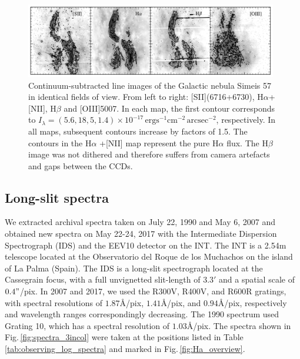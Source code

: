 \documentclass{aa}
\begin{document}
\begin{figure}
\includegraphics[width=0.98\textwidth]{line_images_simeis_4onrow.pdf}
\centering
\caption{Continuum-subtracted line images of the Galactic nebula
  Simeis 57 in identical fields of view. From left to right:
  [SII](6716+6730), H$\alpha$+[NII], H$\beta$ and [OIII]5007.  In
  each map, the first contour corresponds to
  $I_{\lambda} = (5.6, 18, 5, 1.4) \times 10^{-17}\, \mathrm{erg s^{-1}
  cm^{-2} \, arcsec^{-2}}$, respectively. In all maps, subsequent
  contours increase by factors of 1.5. The contours in the H$\alpha$
  +[NII] map represent the pure H$\alpha$ flux. The H$\beta$ image was 
  not dithered and therefore suffers from camera artefacts and gaps 
  between the CCDs.}
\label{fig:line_images_4onrow}
\end{figure}


\subsection{Long-slit spectra}

We extracted archival spectra taken on July 22, 1990 and May 6, 2007 
and obtained new spectra on May 22-24, 2017 with the Intermediate Dispersion
Spectrograph (IDS) and the EEV10 detector on the INT. The INT is a
2.54m telescope located at the Observatorio del Roque de los Muchachos
on the island of La Palma (Spain). The IDS is a long-slit spectrograph
located at the Cassegrain focus, with a full unvignetted slit-length
of $3.3'$ and a spatial scale of $0.4"$/pix. In 2007 and 2017, we used
the R300V, R400V, and R600R gratings, with spectral resolutions of
$1.87$\AA/pix, $1.41$\AA/pix, and $0.94$\AA/pix, respectively and
wavelength ranges correspondingly decreasing. The 1990 spectrum used
Grating 10, which has a spectral resolution of $1.03$\AA/pix.
The spectra shown in Fig.\,\ref{fig:spectra_3incol} were taken at 
the positions listed in Table\,\ref{tab:observing_log_spectra} and 
marked in Fig.\,\ref{fig:Ha_overview}.


\end{document}
